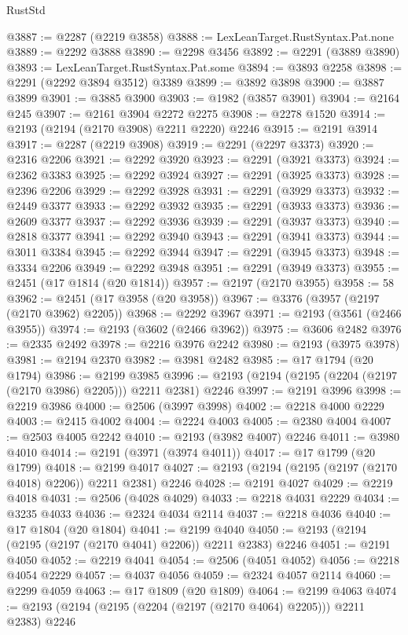 \begin{lexlean}{RustStd}
\begin{coremodule}
@3887 := @2287 (@2219 @3858)
@3888 := LexLeanTarget.RustSyntax.Pat.none
@3889 := @2292 @3888
@3890 := @2298 @3456
@3892 := @2291 (@3889 @3890)
@3893 := LexLeanTarget.RustSyntax.Pat.some
@3894 := @3893 @2258
@3898 := @2291 (@2292 @3894 @3512) @3389
@3899 := @3892 @3898
@3900 := @3887 @3899
@3901 := @3885 @3900
@3903 := @1982 (@3857 @3901)
@3904 := @2164 @245
@3907 := @2161 @3904 @2272 @2275
@3908 := @2278 @1520
@3914 := @2193 (@2194 (@2170 @3908) @2211 @2220) @2246
@3915 := @2191 @3914
@3917 := @2287 (@2219 @3908)
@3919 := @2291 (@2297 @3373)
@3920 := @2316 @2206
@3921 := @2292 @3920
@3923 := @2291 (@3921 @3373)
@3924 := @2362 @3383
@3925 := @2292 @3924
@3927 := @2291 (@3925 @3373)
@3928 := @2396 @2206
@3929 := @2292 @3928
@3931 := @2291 (@3929 @3373)
@3932 := @2449 @3377
@3933 := @2292 @3932
@3935 := @2291 (@3933 @3373)
@3936 := @2609 @3377
@3937 := @2292 @3936
@3939 := @2291 (@3937 @3373)
@3940 := @2818 @3377
@3941 := @2292 @3940
@3943 := @2291 (@3941 @3373)
@3944 := @3011 @3384
@3945 := @2292 @3944
@3947 := @2291 (@3945 @3373)
@3948 := @3334 @2206
@3949 := @2292 @3948
@3951 := @2291 (@3949 @3373)
@3955 := @2451 (@17 @1814 (@20 @1814))
@3957 := @2197 (@2170 @3955)
@3958 := 58
@3962 := @2451 (@17 @3958 (@20 @3958))
@3967 := @3376 (@3957 (@2197 (@2170 @3962) @2205))
@3968 := @2292 @3967
@3971 := @2193 (@3561 (@2466 @3955))
@3974 := @2193 (@3602 (@2466 @3962))
@3975 := @3606 @2482
@3976 := @2335 @2492
@3978 := @2216 @3976 @2242
@3980 := @2193 (@3975 @3978)
@3981 := @2194 @2370
@3982 := @3981 @2482
@3985 := @17 @1794 (@20 @1794)
@3986 := @2199 @3985
@3996 := @2193 (@2194 (@2195 (@2204 (@2197 (@2170 @3986) @2205))) @2211 @2381) @2246
@3997 := @2191 @3996
@3998 := @2219 @3986
@4000 := @2506 (@3997 @3998)
@4002 := @2218 @4000 @2229
@4003 := @2415 @4002
@4004 := @2224 @4003
@4005 := @2380 @4004
@4007 := @2503 @4005 @2242
@4010 := @2193 (@3982 @4007) @2246
@4011 := @3980 @4010
@4014 := @2191 (@3971 (@3974 @4011))
@4017 := @17 @1799 (@20 @1799)
@4018 := @2199 @4017
@4027 := @2193 (@2194 (@2195 (@2197 (@2170 @4018) @2206)) @2211 @2381) @2246
@4028 := @2191 @4027
@4029 := @2219 @4018
@4031 := @2506 (@4028 @4029)
@4033 := @2218 @4031 @2229
@4034 := @3235 @4033
@4036 := @2324 @4034 @2114
@4037 := @2218 @4036
@4040 := @17 @1804 (@20 @1804)
@4041 := @2199 @4040
@4050 := @2193 (@2194 (@2195 (@2197 (@2170 @4041) @2206)) @2211 @2383) @2246
@4051 := @2191 @4050
@4052 := @2219 @4041
@4054 := @2506 (@4051 @4052)
@4056 := @2218 @4054 @2229
@4057 := @4037 @4056
@4059 := @2324 @4057 @2114
@4060 := @2299 @4059
@4063 := @17 @1809 (@20 @1809)
@4064 := @2199 @4063
@4074 := @2193 (@2194 (@2195 (@2204 (@2197 (@2170 @4064) @2205))) @2211 @2383) @2246

\end{coremodule}
\end{lexlean}
